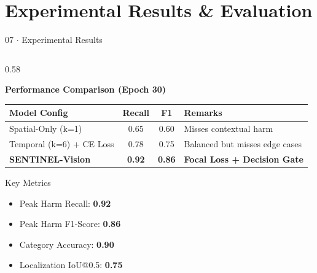 \documentclass[aspectratio=169, 10pt]{beamer}
\begin{document}
\section{Experimental Results \& Evaluation}

\begin{frame}{07 $\cdot$ Experimental Results}

    \begin{columns}[T]

        \begin{column}{0.58\textwidth}

            \textbf{Performance Comparison (Epoch 30)}

            \begin{table}[]

                \centering
                \scriptsize

                \begin{tabularx}{\textwidth}{
                    @{}l c c >{\raggedright\arraybackslash}X@{}
                }

                    \toprule
                    \textbf{Model Config} &
                    \textbf{Recall} &
                    \textbf{F1} &
                    \textbf{Remarks} \\

                    \midrule

                    Spatial-Only (k=1) & 0.65 & 0.60 & Misses contextual harm \\

                    Temporal (k=6) + CE Loss & 0.78 & 0.75 & Balanced but misses edge cases \\

                    \textbf{SENTINEL-Vision} &
                    \textbf{0.92} &
                    \textbf{0.86} &
                    \textbf{Focal Loss + Decision Gate} \\

                    \bottomrule

                \end{tabularx}

            \end{table}

            \vspace{0.1cm}

            \begin{block}{Key Metrics}

                \begin{itemize}
                    \item Peak Harm Recall: \textbf{0.92}
                    \item Peak Harm F1-Score: \textbf{0.86}
                    \item Category Accuracy: \textbf{0.90}
                    \item Localization IoU@0.5: \textbf{0.75}
                \end{itemize}


\end{block}
\end{column}
\end{columns}
\end{frame}
\end{document}
